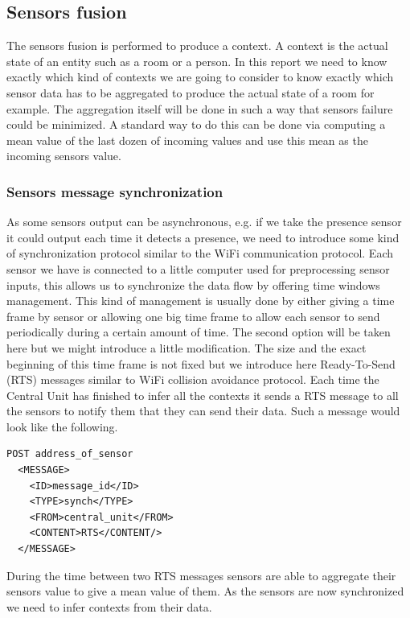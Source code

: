 \documentclass{acm_proc_article-sp}
\begin{document}
\subsection{Sensors fusion}
The sensors fusion is performed to produce a context. A context is the actual state of an entity such as a room or a person. 
In this report we need to know exactly which kind of contexts we are going to consider to know exactly which sensor data has to be aggregated to produce the actual state of a room for example. 
The aggregation itself will be done in such a way that sensors failure could be minimized.
A standard way to do this can be done via computing a mean value of the last dozen of incoming values and use this mean as the incoming sensors value.
\subsubsection{Sensors message synchronization}
As some sensors output can be asynchronous, e.g. if we take the presence sensor it could output each time it detects a presence, we need to introduce some kind of synchronization protocol similar to the WiFi communication protocol.
Each sensor we have is connected to a little computer used for preprocessing sensor inputs, this allows us to synchronize the data flow by offering time windows management.
This kind of management is usually done by either giving a time frame by sensor or allowing one big time frame to allow each sensor to send periodically during a certain amount of time.
The second option will be taken here but we might introduce a little modification. 
The size and the exact beginning of this time frame is not fixed but we introduce here Ready-To-Send (RTS) messages similar to WiFi collision avoidance protocol.
Each time the Central Unit has finished to infer all the contexts it sends a RTS message to all the sensors to notify them that they can send their data.
Such a message would look like the following.

\begin{minipage}{\linewidth}
\begin{lstlisting}
POST address_of_sensor 
  <MESSAGE>
    <ID>message_id</ID>
    <TYPE>synch</TYPE>
    <FROM>central_unit</FROM>
    <CONTENT>RTS</CONTENT/>
  </MESSAGE> 
\end{lstlisting}
\end{minipage}

During the time between two RTS messages sensors are able to aggregate their sensors value to give a mean value of them.
As the sensors are now synchronized we need to infer contexts from their data.
\end{document}
